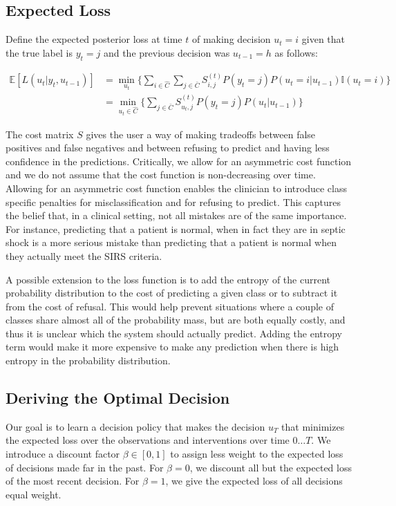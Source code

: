 \documentclass[12pt,solutions]{article}
\newcommand{\I}{\mathbb{I}}
\newcommand{\E}{\mathbb{E}}
\begin{document}
\subsection{Expected Loss}
Define the expected posterior loss at time $t$ of making decision $u_t=i$ given that the true label is $y_t=j$ and the previous decision was $u_{t-1}=h$ as follows:

\begin{align}
\E[L(u_t|y_t, u_{t-1})] &= \min_{u_t} \Big\{ \sum_{i \in \hat{C}} \sum_{j \in \bar{C}} S_{i,j}^{(t)} P(y_t=j)P(u_t=i|u_{t-1})\I(u_t=i)\Big\}\\
&= \min_{u_t \in \hat{C}} \Big\{ \sum_{j \in \bar{C}} S_{u_t,j}^{(t)} P(y_t=j)P(u_t|u_{t-1})\Big\}
\label{eqn:exploss}
\end{align}

The cost matrix $S$ gives the user a way of making tradeoffs between false positives and false negatives and between refusing to predict and having less confidence in the predictions. Critically, we allow for an asymmetric cost function and we do not assume that the cost function is non-decreasing over time. Allowing for an asymmetric cost function enables the clinician to introduce class specific penalties for misclassification and for refusing to predict. This captures the belief that, in a clinical setting, not all mistakes are of the same importance. For instance, predicting that a patient is normal, when in fact they are in septic shock is a more serious mistake than predicting that a patient is normal when they actually meet the SIRS criteria. 

A possible extension to the loss function is to add the entropy of the current probability distribution to the cost of predicting a given class or to subtract it from the cost of refusal. This would help prevent situations where a couple of classes share almost all of the probability mass, but are both equally costly, and thus it is unclear which the system should actually predict. Adding the entropy term would make it more expensive to make any prediction when there is high entropy in the probability distribution.

\subsection{Deriving the Optimal Decision}

Our goal is to learn a decision policy that makes the decision $u_T$ that minimizes the expected loss over the observations and interventions over time $0\ldots T$. We introduce a discount factor $\beta \in [0,1]$ to assign less weight to the expected loss of decisions made far in the past. For $\beta = 0$, we discount all but the expected loss of the most recent decision. For $\beta = 1$, we give the expected loss of all decisions equal weight.
\end{document}
